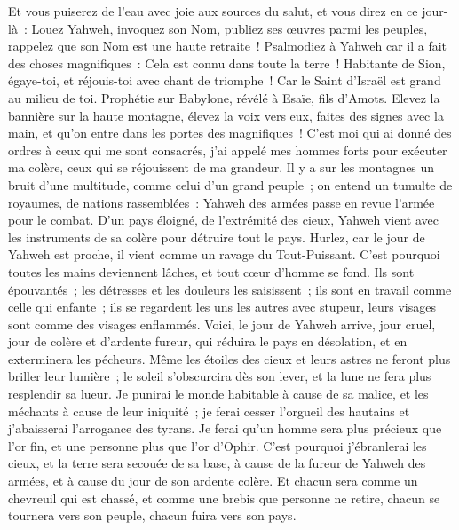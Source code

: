 \begin{multicols}{2}
Et vous puiserez de l'eau avec joie aux sources du salut,
et vous direz en ce jour-là~: Louez Yahweh, invoquez son Nom, publiez ses œuvres parmi les peuples, rappelez que son Nom est une haute retraite~!
Psalmodiez à Yahweh car il a fait des choses magnifiques~: Cela est connu dans toute la terre~!
Habitante de Sion, égaye-toi, et réjouis-toi avec chant de triomphe~! Car le Saint d'Israël est grand au milieu de toi.
\VerseOne{}Prophétie sur Babylone, révélé à Esaïe, fils d'Amots.
Elevez la bannière sur la haute montagne, élevez la voix vers eux, faites des signes avec la main, et qu'on entre dans les portes des magnifiques~!
C'est moi qui ai donné des ordres à ceux qui me sont consacrés, j'ai appelé mes hommes forts pour exécuter ma colère, ceux qui se réjouissent de ma grandeur.
Il y a sur les montagnes un bruit d'une multitude, comme celui d'un grand peuple~; on entend un tumulte de royaumes, de nations rassemblées~: Yahweh des armées passe en revue l'armée pour le combat.
D'un pays éloigné, de l'extrémité des cieux, Yahweh vient avec les instruments de sa colère pour détruire tout le pays.
Hurlez, car le jour de Yahweh est proche, il vient comme un ravage du Tout-Puissant.
C'est pourquoi toutes les mains deviennent lâches, et tout cœur d'homme se fond.
Ils sont épouvantés~; les détresses et les douleurs les saisissent~; ils sont en travail comme celle qui enfante~; ils se regardent les uns les autres avec stupeur, leurs visages sont comme des visages enflammés.
Voici, le jour de Yahweh arrive, jour cruel, jour de colère et d'ardente fureur, qui réduira le pays en désolation, et en exterminera les pécheurs.
Même les étoiles des cieux et leurs astres ne feront plus briller leur lumière~; le soleil s'obscurcira dès son lever, et la lune ne fera plus resplendir sa lueur.
Je punirai le monde habitable à cause de sa malice, et les méchants à cause de leur iniquité~; je ferai cesser l'orgueil des hautains et j'abaisserai l'arrogance des tyrans.
Je ferai qu'un homme sera plus précieux que l'or fin, et une personne plus que l'or d'Ophir.
C'est pourquoi j'ébranlerai les cieux, et la terre sera secouée de sa base, à cause de la fureur de Yahweh des armées, et à cause du jour de son ardente colère.
Et chacun sera comme un chevreuil qui est chassé, et comme une brebis que personne ne retire, chacun se tournera vers son peuple, chacun fuira vers son pays.

\end{multicols}
